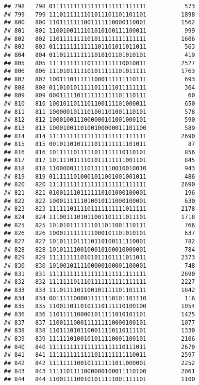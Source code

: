 \documentclass[]{article}
\begin{document}
\begin{verbatim}
## 798   798 0111111111111111111111111111           573
## 799   799 1110111111101011101101101101          1898
## 800   800 1101111111001111110000110001          1562
## 801   801 1100100111101010100111100011           999
## 802   802 1101111111101011111111111111          1606
## 803   803 0111111111111101101011011011           563
## 804   804 0110111111111010101101010101           419
## 805   805 1111111111101111111110010011          2527
## 806   806 1110101111101011111101011111          1763
## 807   807 1001110111111000111111110111           693
## 808   808 0110101011111011111011111111           364
## 809   809 0001111101111111111101110111            60
## 810   810 1001011011101100111101000011           650
## 811   811 1000001011101001101001110101           578
## 812   812 1000100111000000101001000101           590
## 813   813 1000100110100100000011101100           589
## 814   814 1111111111111111111111111111          2690
## 815   815 0010110101111011111111101011            87
## 816   816 1011111011111011111110110101           856
## 817   817 1011110111101011111111001101           845
## 818   818 1100000111101111110010010010           943
## 819   819 0111111010001011001001001011           486
## 820   820 1111111111111111111111111111          2690
## 821   821 0100111101111110101000100001           196
## 822   822 1000111111010010111000100001           630
## 823   823 1111110111101111111111011111          2178
## 824   824 1110011101011001101111011101          1718
## 825   825 1010101111111011011001110111           766
## 826   826 1000111111111000101101010101           637
## 827   827 1010111011110110100111110001           782
## 828   828 1010111100100010100010000001           784
## 829   829 1111111110101011101111011011          2373
## 830   830 1010010111100000100001100001           748
## 831   831 1111111111111111111111111111          2690
## 832   832 1111111011101111111111111111          2227
## 833   833 1110111101100101111101101111          1842
## 834   834 0011111000011111110101101110           116
## 835   835 1100110110101110111110100100          1054
## 836   836 1101111100001011111010101101          1425
## 837   837 1100111000111111110000100101          1077
## 838   838 1101110101100011110110111101          1330
## 839   839 1111110100101011110001100101          2106
## 840   840 1111111111111111111110111011          2670
## 841   841 1111111111111011111111110011          2597
## 842   842 1111111100101111111011000001          2252
## 843   843 1111101111000000100011110100          2061
## 844   844 1100111100101011111001111101          1100

\end{verbatim}
\end{document}
